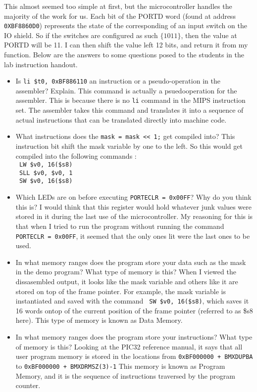 \documentclass[a4paper,11pt]{article}
\begin{document}
This almost seemed too simple at first, but the microcontroller handles the majority of the work for us. Each bit of the PORTD word (found at address \texttt{0XBF8860D0}) represents the state of the corresponding of an input switch on the IO shield. So if the switches are configured as such $\{1 0 1 1\}$, then the value at PORTD will be 11. I can then shift the value left 12 bits, and return it from my function. Below are the answers to some questions posed to the students in the lab instruction handout. 
\begin{itemize}
\item Is \texttt{li \$t0, 0xBF886110} an instruction or a pseudo-operation in the assembler? Explain. This command is actually a psuedooperation for the assembler. This is because there is no \texttt{li} command in the MIPS instruction set. The assembler takes this command and translates it into a sequence of actual instructions that can be translated directly into machine code. 
\item What instructions does the \verb.mask = mask << 1;. get compiled into? This instruction bit shift the mask variable by one to the left. So this would get compiled into the following commands : \\
\verb. LW $v0, 16($s8). \\
\verb. SLL $v0, $v0, 1. \\
\verb. SW $v0, 16($s8). \\

\item Which LEDs are on before executing \texttt{PORTECLR = 0x00FF}? Why do you think this is? I would think that this register would hold whatever junk values were stored in it during the last use of the microcontroller. My reasoning for this is that when I tried to run the program without running the command \texttt{PORTECLR = 0x00FF}, it seemed that the only ones lit were the last ones to be used.

\item In what memory ranges does the program store your data such as the mask in the demo program? What type of memory is this? When I viewed the dissasembled output, it looks like the mask variable and others like it are stored on top of the frame pointer. For example, the mask variable is instantiated and saved with the command \texttt{ SW \$v0, 16(\$s8)}, which saves it 16 words ontop of the current position of the frame pointer (referred to as \$s8 here). This type of memory is known as Data Memory.

\item In what memory ranges does the program store your instructions? What type of memory is this? Looking at the PIC32 reference manual, it says that all user program memory is stored in the locations from \verb.0xBF000000 + BMXDUPBA. to \verb.0xBF000000 + BMXDRMSZ(3)-1. This memory is known as Program Memory, and it is the sequence of instructions traversed by the program counter.


\end{itemize}
\end{document}

